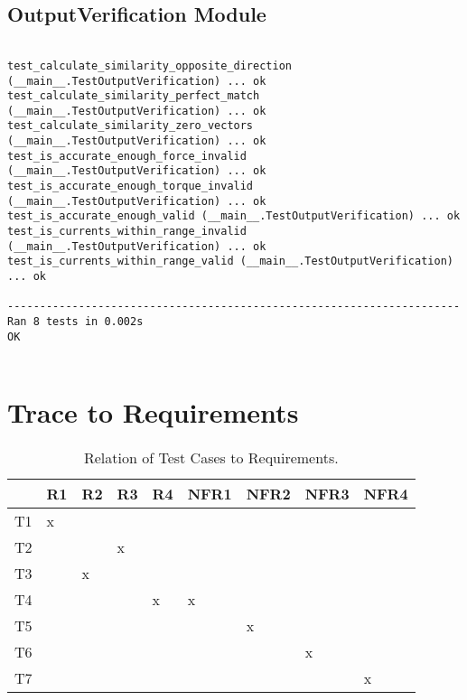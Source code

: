 \documentclass[12pt, titlepage]{article}
\begin{document}
\subsection{OutputVerification Module}
\begin{small}
\begin{verbatim}

test_calculate_similarity_opposite_direction (__main__.TestOutputVerification) ... ok
test_calculate_similarity_perfect_match (__main__.TestOutputVerification) ... ok
test_calculate_similarity_zero_vectors (__main__.TestOutputVerification) ... ok
test_is_accurate_enough_force_invalid (__main__.TestOutputVerification) ... ok
test_is_accurate_enough_torque_invalid (__main__.TestOutputVerification) ... ok
test_is_accurate_enough_valid (__main__.TestOutputVerification) ... ok
test_is_currents_within_range_invalid (__main__.TestOutputVerification) ... ok
test_is_currents_within_range_valid (__main__.TestOutputVerification) ... ok

----------------------------------------------------------------------
Ran 8 tests in 0.002s
OK


\end{verbatim}
\end{small}

\section{Trace to Requirements}
\begin{table}[H]
  \centering
  \caption{Relation of Test Cases to Requirements.}
  \vspace{2mm}
  \label{tab:req_trace}
  \begin{tabular}{|l|l|l|l|l|l|l|l|l|} %
  \hline
     & R1 & R2 & R3 & R4 & NFR1 & NFR2 & NFR3 & NFR4 \\ \hline
  T1 & x  &    &    &    &      &      &      &      \\ \hline
  T2 &    &    &  x  &    &      &      &      &      \\ \hline
  T3 &    &  x  &    &    &      &      &      &      \\ \hline
  T4 &    &    &    &  x  &  x    &      &      &      \\ \hline
  T5 &    &    &    &    &      &   x   &      &      \\ \hline
  T6 &    &    &    &    &      &      &   x   &      \\ \hline
  T7 &    &    &    &    &      &      &      &   x   \\ \hline
  \end{tabular}
\end{table}
		
\end{document}

